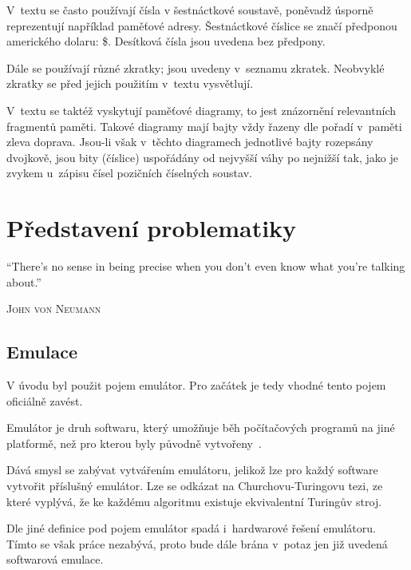 \begin{note*}[Značení]
	V~textu se často používají čísla v šestnáctkové soustavě, poněvadž úsporně reprezentují například paměťové adresy. Šestnáctkové číslice se značí předponou amerického dolaru: \$. Desítková čísla jsou uvedena bez předpony.
	
	Dále se používají různé zkratky; jsou uvedeny v~seznamu zkratek. Neobvyklé zkratky se před jejich použitím v~textu vysvětlují.
	
	V~textu se taktéž vyskytují paměťové diagramy, to jest znázornění relevantních fragmentů paměti. Takové diagramy mají bajty vždy řazeny dle pořadí v~paměti zleva doprava. Jsou-li však v~těchto diagramech jednotlivé bajty rozepsány dvojkově, jsou bity (číslice) uspořádány od nejvyšší váhy po nejnižší tak, jako je zvykem u~zápisu čísel pozičních číselných soustav.
\end{note*}

\chapter{Představení problematiky}
\label{chap:predstaveni-problematiky}

\epigraph{
	\enquote{There's no sense in being precise when you don't even know what you're talking about.}
}{\textsc{John von Neumann}}

\section{Emulace}
V úvodu byl použit pojem emulátor. Pro začátek je tedy vhodné tento pojem oficiálně zavést.

\begin{definition}[Emulátor]
	Emulátor je druh softwaru, který umožňuje běh počítačových programů na jiné platformě, než pro kterou byly původně vytvořeny~\cite{Wikipedia:emulator}.
\end{definition}

\begin{note}[Emulovatelnost]
	Dává smysl se zabývat vytvářením emulátoru, jelikož lze pro každý software vytvořit příslušný emulátor. Lze se odkázat na Churchovu-Turingovu tezi, ze které vyplývá, že ke každému algoritmu existuje ekvivalentní Turingův stroj.
\end{note}

Dle jiné definice pod pojem emulátor spadá i~hardwarové řešení emulátoru. Tímto se však práce nezabývá, proto bude dále brána v~potaz jen již uvedená softwarová emulace.

